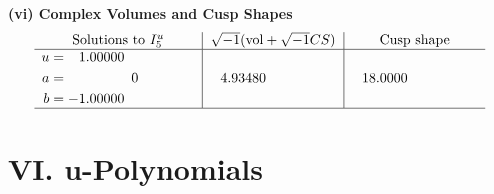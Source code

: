 \documentclass[1p]{elsarticle_modified}
\theoremstyle{definition}
\newcommand{\I}{\sqrt{-1}}
\begin{document}
\newpage\flushleft \textbf{(vi) Complex Volumes and Cusp Shapes}
$$\begin{array}{c|c|c}  
\text{Solutions to }I^u_{5}& \I (\text{vol} + \sqrt{-1}CS) & \text{Cusp shape}\\
 \hline 
\begin{aligned}
u &= \phantom{-}1.00000\phantom{ +0.000000I} \\
a &= \phantom{-0.000000 } 0 \\
b &= -1.00000\phantom{ +0.000000I}\end{aligned}
 & \phantom{-}4.93480\phantom{ +0.000000I} & \phantom{-}18.0000\phantom{ +0.000000I}\\
 \hline 
 \end{array}$$\newpage
\newpage\renewcommand{\arraystretch}{1}
\centering \section*{ VI. u-Polynomials}
\end{document}
